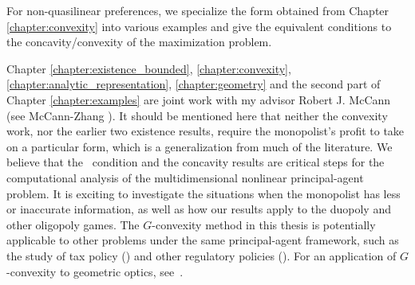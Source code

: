 For non-quasilinear preferences, we specialize the form obtained from Chapter \ref{chapter:convexity} into various examples  and give the equivalent conditions to the concavity/convexity of the maximization problem.\medskip


\begin{remark}
	Chapter \ref{chapter:existence_bounded}, \ref{chapter:convexity}, \ref{chapter:analytic_representation}, \ref{chapter:geometry} and the second part of Chapter \ref{chapter:examples} are joint work with my advisor Robert J. McCann (see McCann-Zhang \cite{McCannZhang17}). It should be mentioned here that neither the convexity work, nor the earlier two existence results, require the monopolist's profit to take on a particular form, which is a generalization from much of the literature. We believe that the \Gthree~condition and the concavity results are critical steps for the computational analysis of the  multidimensional nonlinear principal-agent problem. It is exciting to investigate the situations when the monopolist has less or inaccurate information, as well as how our results apply to the duopoly and other oligopoly games. The $G$-convexity method in this thesis is potentially applicable to other problems under the same principal-agent framework, such as the study of tax policy (\cite{Mirrlees71}) and other regulatory policies (\cite{BaronMyerson82}). For an application of $G$-convexity to geometric optics, see~\cite{GuillenKitagawaCPAM}. \medskip
	
\end{remark}






